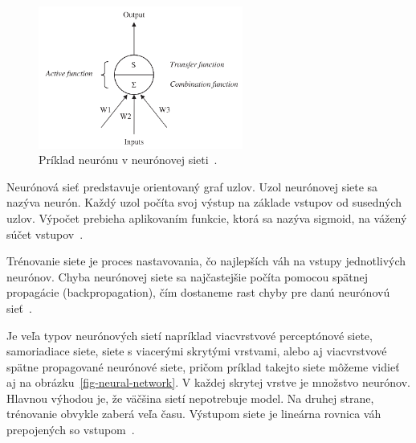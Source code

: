 \documentclass[a4paper,slovak,12pt,appendix]{article}
\begin{document}
\begin{figure}[!ht]
  \centering
  \includegraphics[width=0.6\textwidth]{neuron.png}
  \caption{Príklad neurónu v neurónovej sieti~\cite{Tso2007}.}
  \label{fig-neuron}
\end{figure}

Neurónová sieť predstavuje orientovaný graf uzlov. Uzol neurónovej
siete sa nazýva neurón. Každý uzol počíta svoj výstup na základe vstupov od
susedných uzlov. Výpočet prebieha aplikovaním funkcie, ktorá sa nazýva sigmoid,
na vážený súčet vstupov~\cite{Gruau1994}.

Trénovanie siete je proces nastavovania, čo najlepších váh na vstupy
jednotlivých neurónov. Chyba neurónovej siete sa najčastejšie počíta pomocou
spätnej propagácie (backpropagation), čím dostaneme rast chyby pre danú
neurónovú sieť~\cite{Tso2007}.

Je veľa typov neurónových sietí napríklad viacvrstvové perceptónové siete,
samoriadiace siete, siete s viacerými skrytými vrstvami, alebo aj viacvrstvové
spätne propagované neurónové siete, pričom príklad takejto siete môžeme vidieť
aj na obrázku~\ref{fig-neural-network}. V každej skrytej vrstve je množstvo
neurónov. Hlavnou výhodou je, že väčšina sietí nepotrebuje model. Na druhej strane,
trénovanie obvykle zaberá veľa času. Výstupom siete je lineárna rovnica váh
prepojených so vstupom~\cite{KumarSingh2013}.
\end{document}
